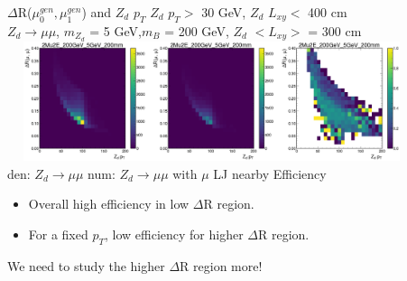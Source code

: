 \documentclass{beamer}
\begin{document}
\begin{frame}[t]{$\Delta$R($\mu^{gen}_0, \mu^{gen}_1$) and $Z_d$ $p_T$ }
\centering
$Z_d$ $p_T>$ 30 GeV, $Z_d$ $L_{xy}<$ 400 cm\\
\scriptsize
\textcolor{UniBlue}{$Z_d \rightarrow \mu\mu$}, \textcolor{uvaorange}{$m_{Z_d}$ = 5 GeV,$m_B$ = 200 GeV, $Z_d$ $<L_{xy}>$ = 300 cm}\\
\centering
\includegraphics[width =12cm, height =3.5cm]{zd_mumu_pt_dR_5.png}\\
{\tiny \textcolor{uvaorange}{\hspace{-1cm}den: $Z_d\rightarrow\mu\mu$ \hspace{2.5cm } num: $Z_d\rightarrow\mu\mu$ with  $\mu$ LJ nearby\hspace{2cm} Efficiency\\}}

\normalsize
\begin{itemize}
\item  Overall high efficiency in low $\Delta$R region.
     \vspace{1pt}
\item For a fixed $p_T$, low efficiency for higher $\Delta$R region.
\end{itemize}
We need to study the higher $\Delta$R region more!
\end{frame}
\end{document}
